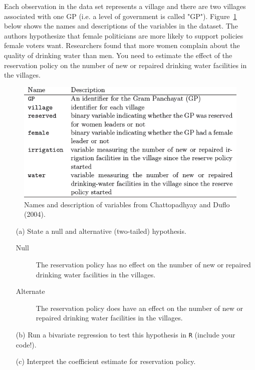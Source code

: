 \documentclass[12pt,letterpaper]{article}
\begin{document}
\noindent Each observation in the data set represents a village and there are two villages associated with one GP (i.e. a level of government is called "GP"). Figure~\ref{fig:women_desc}
below shows the names and descriptions of the variables in the dataset. The authors hypothesize that female politicians are more likely to support policies female voters want. Researchers found that more women complain about the quality of drinking water than men. You need to estimate the effect of the reservation policy on the number of new or repaired drinking water facilities in the villages.
\vspace{.5cm}
\begin{figure}[h!]
	\caption{\footnotesize{Names and description of variables from Chattopadhyay and Duflo (2004).}}
	\vspace{.5cm}
	\centering
	\label{fig:women_desc}
	\includegraphics[width=1.0\textwidth]{graphics/women_desc.png}
\end{figure}		

\newpage
\begin{enumerate}
	\item [(a)] State a null and alternative (two-tailed) hypothesis. 
	
	\begin{description}
	  \item [Null] The reservation policy has no effect on the number of new or 
	  repaired drinking water facilities in the villages.
	  \item [Alternate] The reservation policy does have an effect on the number of new or 
	  repaired drinking water facilities in the villages.
	\end{description}
	
	\item [(b)] Run a bivariate regression to test this hypothesis in \texttt{R} 
	(include your code!).
	
	
	
	\vspace{6cm}
	\item [(c)] Interpret the coefficient estimate for reservation policy. 
\end{enumerate}
\end{document}
